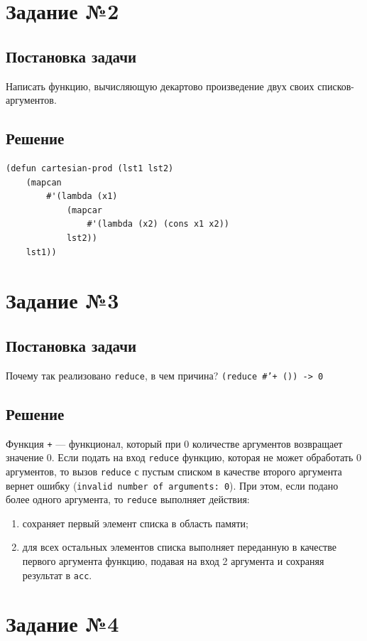 \documentclass[12pt]{report}
\begin{document}
\section*{Задание №2}
\subsection*{Постановка задачи}
Написать функцию, вычисляющую декартово произведение двух своих списков-аргументов.

\subsection*{Решение}
\begin{lstlisting}
(defun cartesian-prod (lst1 lst2)
	(mapcan
		#'(lambda (x1)
			(mapcar
				#'(lambda (x2) (cons x1 x2))
			lst2))
	lst1))
\end{lstlisting}


\section*{Задание №3}
\subsection*{Постановка задачи}
Почему так реализовано \texttt{reduce}, в чем причина? \texttt{(reduce \#'+ ()) -> 0}

\subsection*{Решение}
Функция \texttt{+} --- функционал, который при 0 количестве аргументов возвращает значение 0. Если подать на вход \texttt{reduce} функцию, которая не может обработать 0 аргументов, то вызов \texttt{reduce} с пустым списком в качестве второго аргумента вернет ошибку (\texttt{invalid number of arguments: 0}). При этом, если подано более одного аргумента, то \texttt{reduce} выполняет действия:

\begin{enumerate}
	\item сохраняет первый элемент списка в область памяти;
	\item для всех остальных элементов списка выполняет переданную в качестве первого аргумента функцию, подавая на вход 2 аргумента и сохраняя результат в \texttt{acc}.
\end{enumerate}

\section*{Задание №4}
\end{document}

